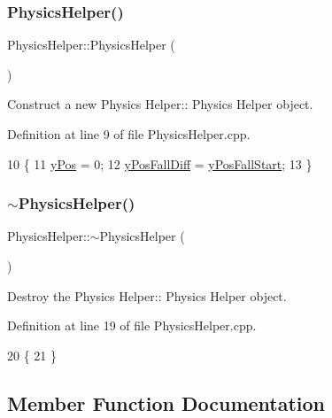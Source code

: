 \subsubsection{\texorpdfstring{Physics\+Helper()}{PhysicsHelper()}}
{\footnotesize\ttfamily Physics\+Helper\+::\+Physics\+Helper (\begin{DoxyParamCaption}{ }\end{DoxyParamCaption})}



Construct a new Physics Helper\+:\+: Physics Helper object. 



Definition at line 9 of file Physics\+Helper.\+cpp.


\begin{DoxyCode}
10 \{
11     \mbox{\hyperlink{class_physics_helper_a8d1eda19cdbede456e4fb973a19802a4}{yPos}} = 0;
12     \mbox{\hyperlink{class_physics_helper_a0c1293f0d07c93ffa688f67285327d35}{yPosFallDiff}} = \mbox{\hyperlink{class_physics_helper_a11582a39916e5ec33325d99d1d67235a}{yPosFallStart}};
13 \}
\end{DoxyCode}
\mbox{\label{class_physics_helper_a1cbbe3db0c995d8a45436cbdf4271563}} 
\subsubsection{\texorpdfstring{$\sim$\+Physics\+Helper()}{~PhysicsHelper()}}
{\footnotesize\ttfamily Physics\+Helper\+::$\sim$\+Physics\+Helper (\begin{DoxyParamCaption}{ }\end{DoxyParamCaption})}



Destroy the Physics Helper\+:\+: Physics Helper object. 



Definition at line 19 of file Physics\+Helper.\+cpp.


\begin{DoxyCode}
20 \{
21 \}
\end{DoxyCode}


\subsection{Member Function Documentation}
\mbox{\label{class_physics_helper_a9a1738f377db71f239d55ce65ba8f442}} 
